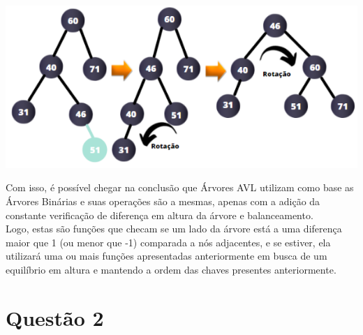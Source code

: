 \documentclass[11pt]{article} %
\begin{document}
\begin{enumerate}[a)]
		\begin{center}
			\includegraphics[scale = 0.85]{rotadupl.png}
		\end{center}	

\hspace*{1cm}Com isso, é possível chegar na conclusão que Árvores AVL utilizam como base as Árvores Binárias e suas operações são a mesmas, apenas com a adição da constante verificação de diferença em altura da árvore e balanceamento. \\ Logo, estas são funções que checam se um lado da árvore está a uma diferença maior que 1 (ou menor que -1)  comparada a nós adjacentes, e se estiver, ela utilizará uma ou mais funções apresentadas anteriormente em busca de um equilíbrio em altura e mantendo a ordem das chaves presentes anteriormente.

	\end{enumerate}

\newpage

\section{Questão 2}
\end{document}
